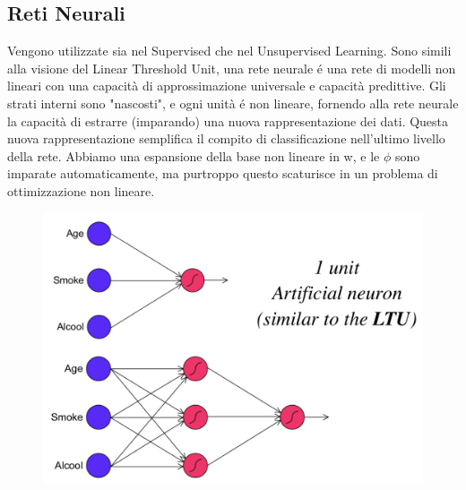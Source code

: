 \documentclass{article}
\begin{document}
\subsection{Reti Neurali}
Vengono utilizzate sia nel Supervised che nel Unsupervised Learning. Sono simili alla visione del Linear Threshold Unit, una rete neurale é una rete di modelli non lineari con una capacità di approssimazione universale e capacità predittive. Gli strati interni sono "nascosti", e ogni unità é non lineare, fornendo alla rete neurale la capacità di estrarre (imparando) una nuova rappresentazione dei dati. Questa nuova rappresentazione semplifica il compito di classificazione nell'ultimo livello della rete. \newline 
Abbiamo una espansione della base non lineare in w, e le $\phi$ sono imparate automaticamente, ma purtroppo questo scaturisce in un problema di ottimizzazione non lineare. 
\begin{figure}[H]
\centering
\includegraphics[scale=0.4]{Images/NN.png}
\end{figure}
\end{document}
